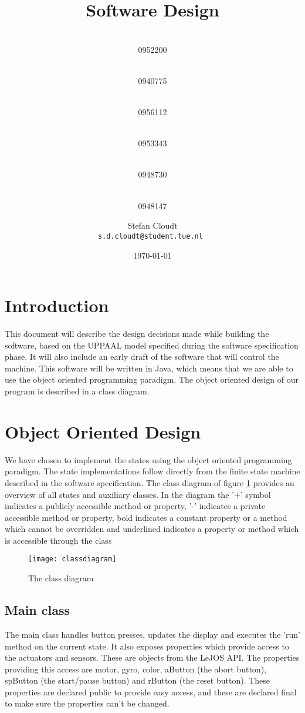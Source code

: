 \documentclass[a4paper,oneside,11pt]{article}
\title{\vspace{-\baselineskip}\sffamily\bfseries Software Design}
\author{
	\makebox[.25\linewidth]{Sergio van Amerongen}\\0952200 \and
	\makebox[.25\linewidth]{Stefan Cloudt}\\0940775 \and
	\makebox[.25\linewidth]{Daan de Graaf}\\0956112 \and
	\makebox[.25\linewidth]{Robert van Lente}\\0953343 \and
	\makebox[.25\linewidth]{Tom Peters}\\0948730 \and
	\makebox[.25\linewidth]{Berrie Trippe}\\0948147 
	\and \makebox[.75\linewidth]{\textbf{Responsible:}} \and
	Stefan Cloudt\\ \tt{s.d.cloudt@student.tue.nl}
}
\date{\today}
\begin{document}
\maketitle
\section{Introduction}
This document will describe the design decisions made while building the software, based on the UPPAAL model specified during the software specification phase. It will also include an early draft of the software that will control the machine. This software will be written in Java, which means that we are able to use the object oriented programming paradigm. The object oriented design of our program is described in a class diagram.

\section{Object Oriented Design}
We have chosen to implement the states using the object oriented programming paradigm. The state implementations follow directly from the finite state machine described in the software specification. The class diagram of figure \ref{classdiagram} provides an overview of all states and auxiliary classes. In the diagram the '+' symbol indicates a publicly accessible method or property, '-' indicates a private accessible method or property, bold indicates a constant property or a method which cannot be overridden and underlined indicates a property or method which is accessible through the class

\begin{figure}[ht!]
\centering
\texttt{[image: classdiagram]}
\caption{The class diagram}
\label{classdiagram}
\end{figure}

\newpage
\subsection{Main class}
The main class handles button presses, updates the display and executes the 'run' method on the current state. It also exposes properties which provide access to the actuators and sensors. These are objects from the LeJOS API. The properties providing this access are motor, gyro, color, aButton (the abort button), spButton (the start/pause button) and rButton (the reset button). These properties are declared public to provide easy access, and these are declared final to make sure the properties can’t be changed.
\end{document}
